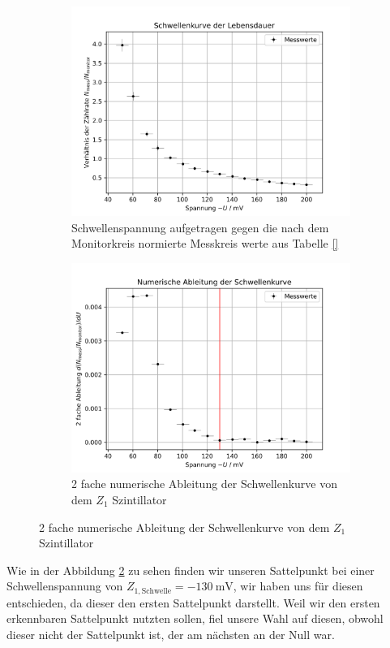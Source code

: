 \documentclass{article}
\begin{document}
\begin{figure}[H]
    \centering
    \begin{subfigure}[b]{0.48\textwidth}
        \includegraphics[width=\textwidth]{figures/Schwellenspannung_Lebensdauer.png}
        \caption{Schwellenspannung aufgetragen gegen die nach dem Monitorkreis normierte Messkreis werte aus Tabelle \ref{}}
        \label{fig:SchwellspannungLebensdauer}
    \end{subfigure}
    \hfill
    \begin{subfigure}[b]{0.48\textwidth}
        \includegraphics[width=\textwidth]{figures/Schwellenspannung_Lebensdauer_ableitung.png}
        \caption{2 fache numerische Ableitung der Schwellenkurve von dem $Z_1$ Szintillator}
        \label{fig:SchwellspannungLebensdauerAbleitung}
    \end{subfigure}
    \label{fig:SchwellspannungLebensdauerKomplett}
\end{figure}
Wie in der Abbildung \ref{fig:SchwellspannungLebensdauerAbleitung} zu sehen finden wir unseren Sattelpunkt bei einer Schwellenspannung von 
$Z_{1,\text{Schwelle}}=\SI{-130}{\milli\volt}$, wir haben uns für diesen entschieden, da dieser den ersten Sattelpunkt darstellt. Weil wir den ersten erkennbaren Sattelpunkt nutzten sollen, fiel unsere Wahl auf diesen,
obwohl dieser nicht der Sattelpunkt ist, der am nächsten an der Null war.
\end{document}
